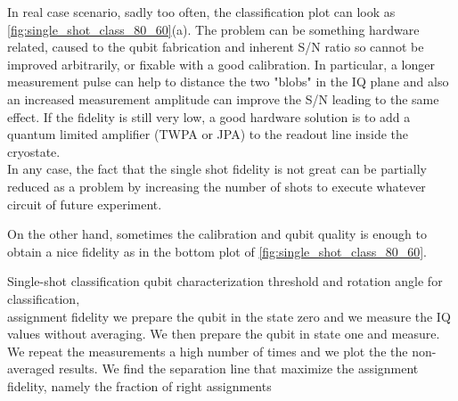 In real case scenario, sadly too often, the classification plot can look as \cref{fig:single_shot_class_80_60}(a).
The problem can be something hardware related, caused to the qubit fabrication and inherent S/N ratio so cannot be improved arbitrarily, or fixable with a good calibration.
In particular, a longer measurement pulse can help to distance the two "blobs" in the IQ plane and also an increased measurement amplitude can improve the S/N leading to the same effect.
If the fidelity is still very low, a good hardware solution is to add a quantum limited amplifier (TWPA or JPA) to the readout line inside the cryostate.\\
In any case, the fact that the single shot fidelity is not great can be partially reduced as a problem by increasing the number of shots to execute whatever circuit of future experiment.

On the other hand, sometimes the calibration and qubit quality is enough to obtain a nice fidelity as in the bottom plot of \cref{fig:single_shot_class_80_60}.




\experimentrecap
{Single-shot classification}
{qubit characterization}
{threshold and rotation angle for classification,\\assignment fidelity}
{we prepare the qubit in the state zero and we measure the IQ values without averaging. We then prepare the qubit in state one and measure. We repeat the measurements a high number of times and we plot the the non-averaged results. We find the separation line that maximize the assignment fidelity, namely the fraction of right assignments}
